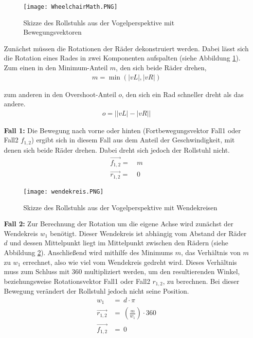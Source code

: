 \begin{figure}[h]
    \centering
    \texttt{[image: WheelchairMath.PNG]}
    \caption{Skizze des Rollstuhls aus der Vogelperspektive mit Bewegungsvektoren}
    \label{fig:wheelchairMath}
\end{figure}

Zunächst müssen die Rotationen der Räder dekonstruiert werden.
Dabei lässt sich die Rotation eines Rades in zwei Komponenten aufspalten (siehe Abbildung \ref{fig:wheelchairMath}).
Zum einen in den Minimum-Anteil $m$, den sich beide Räder drehen,
\begin{align}
    m = \min{(\left| vL \right|,\left| vR\right|)}
\end{align}

zum anderen in den Overshoot-Anteil $o$, den sich ein Rad schneller dreht als das andere.
\begin{align}
    o = \left|\left| vL \right|-\left| vR\right| \right|
\end{align}

\textbf{Fall 1:}
Die Bewegung nach vorne oder hinten (Fortbewegungsvektor Fall1 oder Fall2 $f_{1,2}$) ergibt sich in diesem Fall aus dem Anteil der Geschwindigkeit, mit denen sich beide Räder drehen.
Dabei dreht sich jedoch der Rollstuhl nicht.
\begin{align}
    \vec{f_{1,2}} = & \ m \\
    \vec{r_{1,2}} = & \ 0
\end{align}

\begin{figure}[h]
    \centering
    \texttt{[image: wendekreis.PNG]}
    \caption{Skizze des Rollstuhls aus der Vogelperspektive mit Wendekreisen}
    \label{fig:wendekreis}
\end{figure}

\textbf{Fall 2:}
Zur Berechnung der Rotation um die eigene Achse wird zunächst der Wendekreis $w_1$ benötigt.
Dieser Wendekreis ist abhängig vom Abstand der Räder $d$ und dessen Mittelpunkt liegt im Mittelpunkt zwischen den Rädern (siehe Abbildung \ref{fig:wendekreis}).
Anschließend wird mithilfe des Minimums $m$, das Verhältnis von $m$ zu $w_1$ errechnet, also wie viel vom Wendekreis gedreht wird.
Dieses Verhältnis muss zum Schluss mit $360$ multipliziert werden, um den resultierenden Winkel, beziehungsweise Rotationsvektor Fall1 oder Fall2 $r_{1,2}$, zu berechnen.
Bei dieser Bewegung verändert der Rollstuhl jedoch nicht seine Position.
\begin{align}
    w_1           & =            \ d \cdot \pi                  \\
    \vec{r_{1,2}} & =  \ \left(\frac {m} {w_1}\right) \cdot 360 \\
    \vec{f_{1,2}} & =  \ 0
\end{align}

